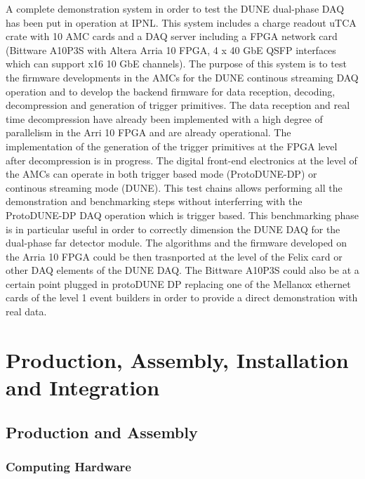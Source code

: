 A complete demonstration system in order to test the DUNE dual-phase DAQ has been put in operation at IPNL. This system
includes a charge readout uTCA crate with 10 AMC cards and a DAQ server including a FPGA network card (Bittware A10P3S with Altera Arria 10 FPGA,
4 x 40 GbE QSFP interfaces which can support  x16 10 GbE channels). The purpose of this system is to test the firmware developments in the AMCs for the DUNE continous streaming DAQ operation and  to develop the backend firmware for data reception, decoding, decompression and generation of trigger primitives. The data reception and real time decompression have already been implemented with a high degree of parallelism in the Arri 10 FPGA and are already operational. The implementation of the generation of the trigger primitives at the FPGA level after decompression is in progress. The digital front-end electronics at the level of the AMCs can operate in both trigger based mode (ProtoDUNE-DP) or continous streaming mode (DUNE). This test chains allows performing all the demonstration and benchmarking steps without interferring with the ProtoDUNE-DP DAQ operation which is trigger based. This benchmarking phase is in particular useful in order to correctly dimension the DUNE DAQ for the dual-phase far detector module. The algorithms and the firmware developed on the Arria 10 FPGA could be then trasnported at the level of the Felix card or other DAQ elements of the DUNE DAQ. The Bittware A10P3S could also be at a certain point plugged in protoDUNE DP replacing one of the Mellanox ethernet cards of the level 1 event builders in order to provide a direct demonstration with real data.


\section{Production, Assembly, Installation and Integration}
\label{sec:daq:production}


\subsection{Production and Assembly}

\subsubsection{Computing Hardware}

